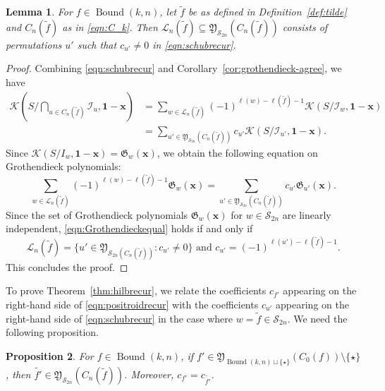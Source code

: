 \documentclass[12pt,reqno]{amsart}
\newtheorem{lemma}{Lemma}[section]
\newtheorem{prop}[lemma]{Proposition}
\theoremstyle{definition}
\newcommand{\cI}{\mathcal{I}}
\newcommand{\symm}{\mathcal{S}}
\newcommand{\bound}{\operatorname{Bound}}
\newcommand{\genP}{\mathfrak{Y}}
\newcommand{\Lenart}{\mathcal{L}}
\begin{document}
{\begin{lemma}\label{lemma:Ln}
    For $f\in\bound(k,n)$, let $\widetilde{f}$ be as defined in Definition~\ref{def:tilde} and $C_n(\widetilde{f})$ as in \eqref{eqn:C_k}. 
    Then $\Lenart_n(\widetilde{f})\subseteq \genP_{\symm_{2n}}(C_n(\widetilde{f}))$ consists of permutations $u'$ such that $c_{u'}\neq 0$ in \eqref{eqn:schubrecur}.
\end{lemma}


\begin{proof}
    Combining \eqref{eqn:schubrecur} and Corollary~\ref{cor:grothendieck-agree}, we have
    \begin{align*}
        \mathcal{K}(S/\bigcap_{u\in C_n(\tilde{f})}\mathcal{I}_u, \mathbf{1-x}) &= \sum_{w\in \mathcal{L}_n(\tilde{f})} (-1)^{\ell(w)-\ell(\tilde{f})-1}\mathcal{K}(S/\cI_{w},\mathbf{1-x})\\
        &= \sum_{u'\in \genP_{\symm_{2n}}(C_n(\tilde{f}))} c_{u'}\mathcal{K}(S/\cI_{u'},\mathbf{1-x}). 
    \end{align*}
Since $\mathcal{K}(S/I_w,\mathbf{1-x}) = \mathfrak{G}_{w}(\mathbf{x})$, we obtain the following equation on Grothendieck polynomials:
\begin{equation}\label{eqn:Grothendieckequal}
    \sum_{w\in \mathcal{L}_n(\tilde{f})} (-1)^{\ell(w)-\ell(\tilde{f})-1}\mathfrak{G}_w(\mathbf{x})
        = \sum_{u'\in \genP_{\symm_{2n}}(C_n(\tilde{f}))} c_{u'}\mathfrak{G}_{u'}(\mathbf{x}).
\end{equation}
Since the set of Grothendieck polynomials $\mathfrak{G}_w(\mathbf{x})$ for $w\in \symm_{2n}$ are linearly independent, \eqref{eqn:Grothendieckequal} holds if and only if 
\[\mathcal{L}_n(\tilde{f}) = \{u'\in \genP_{\mathcal{S}_{2n}(C_n(\tilde{f}))}: c_{u'}\neq 0\}\text{ and }c_{u'} = (-1)^{\ell(u')-\ell(\tilde{f})-1}.\]
This concludes the proof.
\end{proof}
To prove Theorem~\ref{thm:hilbrecur}, we
relate the coefficients $c_{f'}$ appearing on the right-hand side of \eqref{eqn:positroidrecur} with the coefficients $c_{u'}$ appearing on the right-hand side of \eqref{eqn:schubrecur} in the case where $w = \widetilde{f}\in \symm_{2n}$. 
We need the following proposition.

\begin{prop}\label{prop:chain}
    For $f\in \bound(k,n)$, if
    $f'\in \genP_{\bound(k,n)\sqcup \{\star\}}(C_0(f))\setminus \{\star\}$, then   $\widetilde{f'}\in \genP_{\symm_{2n}}(C_{n}(\widetilde{f}))$. Moreover, $c_{f'} = c_{\widetilde{f'}}$.
\end{prop}

}
\end{document}
